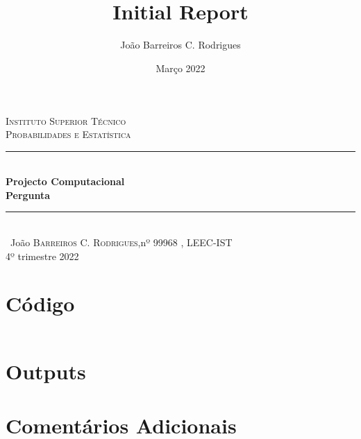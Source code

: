 \documentclass[a4paper,12pt]{article}
\date{Março 2022}
\title{ \\ \large {Initial Report}}
\author{João Barreiros C. Rodrigues}
\begin{document}
        \begin{titlepage} %
        \newcommand{\HRule}{\rule{\linewidth}{0.5mm}} %
        \center %
        \textsc{\LARGE Instituto Superior Técnico}\\[1.5cm] %
        \textsc{\Large Probabilidades e Estatística}\\[0.25cm]
        \HRule\\[0.4cm]
        {\LARGE\bfseries Projecto Computacional}\\[0.4cm] %
        {\huge\bfseries Pergunta}\\[0.4cm] %
        \HRule\\[1.5cm]\
        João \textsc{Barreiros C. Rodrigues},nº 99968 , LEEC-IST\\
        \vfill\vfill\vfill %
        {\large 4º trimestre 2022} %
        \vfill %
\end{titlepage}
        \newpage
        \tableofcontents
        \clearpage
	\section{Código}
	\inputminted{r}{Module.R}
	\section{Outputs}
	\section{Comentários Adicionais}
\end{document}
